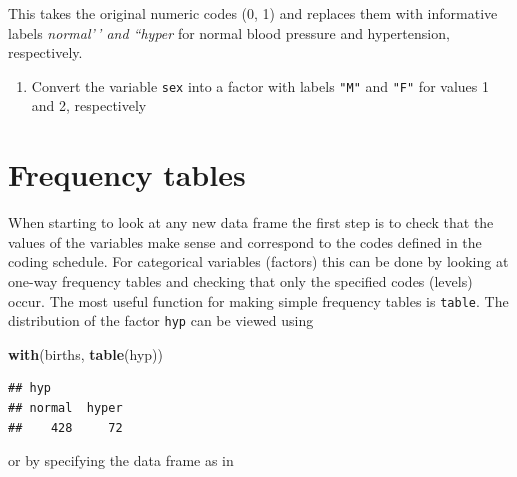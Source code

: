 \documentclass[
]{book}
\newenvironment{Shaded}{\begin{snugshade}}{\end{snugshade}}
\newcommand{\AttributeTok}[1]{\textcolor[rgb]{0.13,0.29,0.53}{#1}}
\newcommand{\FunctionTok}[1]{\textcolor[rgb]{0.13,0.29,0.53}{\textbf{#1}}}
\newcommand{\NormalTok}[1]{#1}
\newcommand{\OtherTok}[1]{\textcolor[rgb]{0.56,0.35,0.01}{#1}}
\newcommand{\SpecialCharTok}[1]{\textcolor[rgb]{0.81,0.36,0.00}{\textbf{#1}}}
\newcommand{\StringTok}[1]{\textcolor[rgb]{0.31,0.60,0.02}{#1}}
\providecommand{\tightlist}{%
  \setlength{\itemsep}{0pt}\setlength{\parskip}{0pt}}
\begin{document}
\begin{Shaded}
\end{Shaded}

This takes the original numeric codes (0, 1) and replaces them with
informative labels \emph{normal'\,' and ``hyper} for normal blood pressure
and hypertension, respectively.

\begin{enumerate}
\def\labelenumi{\arabic{enumi}.}
\tightlist
\item
  Convert the variable \texttt{sex} into a factor
  with labels \texttt{"M"} and \texttt{"F"} for values 1 and 2, respectively
\end{enumerate}

\section{Frequency tables}\label{frequency-tables}

When starting to look at any new data frame the first step is to check
that the values of the variables make sense and correspond to the
codes defined in the coding schedule. For categorical variables
(factors) this can be done by looking at one-way frequency tables and
checking that only the specified codes (levels) occur. The most
useful function for making simple frequency tables is \texttt{table}.
The distribution of the factor \texttt{hyp} can be viewed using

\begin{Shaded}
\begin{Highlighting}[]
\FunctionTok{with}\NormalTok{(births, }\FunctionTok{table}\NormalTok{(hyp))}
\end{Highlighting}
\end{Shaded}

\begin{verbatim}
## hyp
## normal  hyper 
##    428     72
\end{verbatim}

or by specifying the data frame as in

\begin{Shaded}
\end{Shaded}
\end{document}
